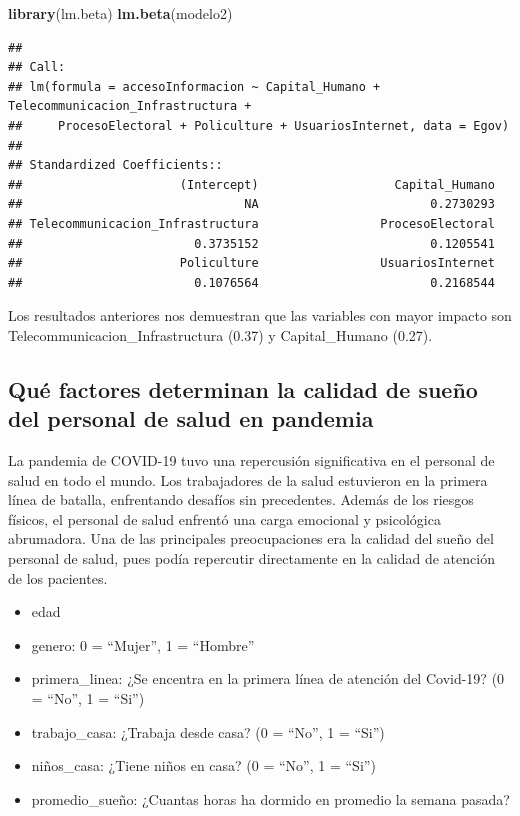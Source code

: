 \documentclass[
]{article}
\newenvironment{Shaded}{\begin{snugshade}}{\end{snugshade}}
\newcommand{\FunctionTok}[1]{\textcolor[rgb]{0.13,0.29,0.53}{\textbf{#1}}}
\newcommand{\NormalTok}[1]{#1}
\providecommand{\tightlist}{%
  \setlength{\itemsep}{0pt}\setlength{\parskip}{0pt}}
\begin{document}
\begin{Shaded}
\begin{Highlighting}[]
\FunctionTok{library}\NormalTok{(lm.beta)}
\FunctionTok{lm.beta}\NormalTok{(modelo2)}
\end{Highlighting}
\end{Shaded}

\begin{verbatim}
## 
## Call:
## lm(formula = accesoInformacion ~ Capital_Humano + Telecommunicacion_Infrastructura + 
##     ProcesoElectoral + Policulture + UsuariosInternet, data = Egov)
## 
## Standardized Coefficients::
##                      (Intercept)                   Capital_Humano 
##                               NA                        0.2730293 
## Telecommunicacion_Infrastructura                 ProcesoElectoral 
##                        0.3735152                        0.1205541 
##                      Policulture                 UsuariosInternet 
##                        0.1076564                        0.2168544
\end{verbatim}

Los resultados anteriores nos demuestran que las variables con mayor
impacto son Telecommunicacion\_Infrastructura (0.37) y Capital\_Humano
(0.27).

\subsection{\texorpdfstring{\textbf{Qué factores determinan la calidad
de sueño del personal de salud en
pandemia}}{Qué factores determinan la calidad de sueño del personal de salud en pandemia}}\label{quuxe9-factores-determinan-la-calidad-de-sueuxf1o-del-personal-de-salud-en-pandemia}

La pandemia de COVID-19 tuvo una repercusión significativa en el
personal de salud en todo el mundo. Los trabajadores de la salud
estuvieron en la primera línea de batalla, enfrentando desafíos sin
precedentes. Además de los riesgos físicos, el personal de salud
enfrentó una carga emocional y psicológica abrumadora. Una de las
principales preocupaciones era la calidad del sueño del personal de
salud, pues podía repercutir directamente en la calidad de atención de
los pacientes.

\begin{itemize}
\tightlist
\item
  edad
\item
  genero: 0 = ``Mujer'', 1 = ``Hombre''
\item
  primera\_linea: ¿Se encentra en la primera línea de atención del
  Covid-19? (0 = ``No'', 1 = ``Si'')
\item
  trabajo\_casa: ¿Trabaja desde casa? (0 = ``No'', 1 = ``Si'')
\item
  niños\_casa: ¿Tiene niños en casa? (0 = ``No'', 1 = ``Si'')
\item
  promedio\_sueño: ¿Cuantas horas ha dormido en promedio la semana
  pasada?
\end{itemize}
\end{document}
